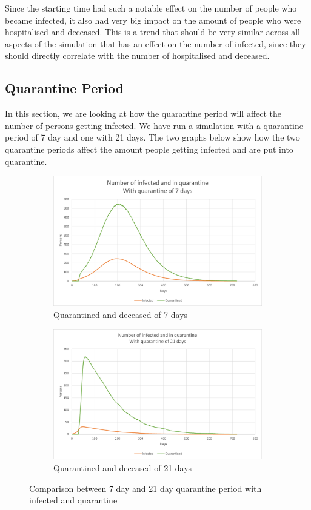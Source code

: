 Since the starting time had such a notable effect on the number of people who became infected, it also had very big impact on the amount of people who were hospitalised and deceased. This is a trend that should be very similar across all aspects of the simulation that has an effect on the number of infected, since they should directly correlate with the number of hospitalised and deceased.

\subsection{Quarantine Period}
In this section, we are looking at how the quarantine period will affect the number of persons getting infected. We have run a simulation with a quarantine period of 7 day and one with 21 days. The two graphs below show how the two quarantine periods affect the amount people getting infected and are put into quarantine.

\begin{figure}[H]
\centering
\begin{subfigure}{.5\textwidth}
  \centering
  \includegraphics[width=.95\linewidth]{0_billeder/CT_Q_7.png}
  \caption{Quarantined and deceased of 7 days}
  \label{fig:CT_Q_7}
\end{subfigure}%
\begin{subfigure}{.5\textwidth}
  \centering
  \includegraphics[width=.95\linewidth]{0_billeder/CT_Q_21.png}
  \caption{Quarantined and deceased of 21 days}
  \label{fig:CT_Q_21}
\end{subfigure}
\caption{Comparison between 7 day and 21 day quarantine period with infected and quarantine}
\label{fig:test}
\end{figure}

